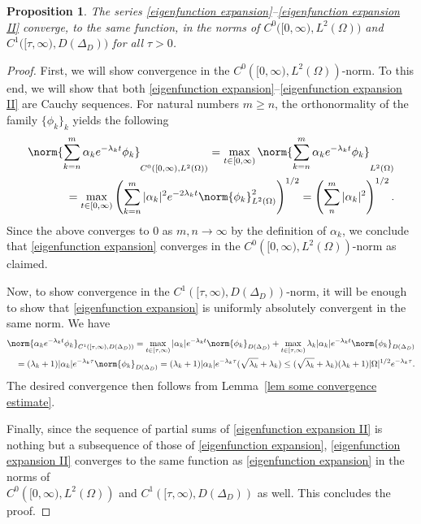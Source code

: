 \documentclass[a4paper,11pt]{article}
\newtheorem{proposition}[theorem]{Proposition}
\newcommand{\al}{\alpha}
\numberwithin{equation}{section}
\begin{document}
\begin{proposition}\label{prop convergence of series}
The series \eqref{eigenfunction expansion}--\eqref{eigenfunction expansion II}
converge, to the same function, in the norms of $C^0\big([0,\infty), L^2(\Omega)\big)$ and $C^1\big([\tau,\infty), D(\Delta_D)\big)$ for all $\tau>0$.
\end{proposition}
\begin{proof}
First, we will show convergence in the $C^0\left([0,\infty), L^2(\Omega)\right)$-norm. 
To this end, we will show that both \eqref{eigenfunction expansion}--\eqref{eigenfunction expansion II} are Cauchy sequences. For natural numbers $m\ge n$, the orthonormality of the family $\{\phi_k\}_k$ yields the following 
\begin{equation*}
\begin{aligned}
    \norm{\sum_{k=n}^m \al_k e^{-\lambda_k t }\phi_k}_{C^0\left([0,\infty),L^2(\Omega)\right)}= 
    \max_{t\in [0,\infty)}\norm{\sum_{k=n}^m \alpha_k e^{-\lambda_k t} \phi_k}_{L^2(\Omega)}\\
    =\max_{t\in [0,\infty)}\left(\sum_{k=n}^m |\alpha_k|^2 e^{-2\lambda_k t} \norm{\phi_k}^2_{L^2(\Omega)} \right)^{1/2}  = \left( \sum_{n}^m |\alpha_k|^2\right)^{1/2}.  
\end{aligned}
\end{equation*}
Since the above converges to $0$ as $m,n\to\infty$ by the definition of $\alpha_k$, we conclude that \eqref{eigenfunction expansion} converges in the $C^0\left([0,\infty),L^2(\Omega)\right)$-norm as claimed. 

Now, to show convergence in the $C^1\left([\tau,\infty),D(\Delta_D)\right)$-norm, it will be enough to show that \eqref{eigenfunction expansion} is uniformly absolutely convergent in the same norm. We have
\begin{equation*}
\begin{aligned}
    \norm{\al_k e^{-\lambda_k t} \phi_k}_{C^1\left([\tau,\infty), D(\Delta_D)\right)}= \max_{t\in [\tau,\infty)}|\alpha_k| e^{-\lambda_k t} \norm{\phi_k}_{D(\Delta_D)}+
    \max_{t\in [\tau,\infty)}\lambda_k |\alpha_k| e^{-\lambda_k t} \norm{\phi_k}_{D(\Delta_D)}\\
    = (\lambda_k+1)|\alpha_k|e^{-\lambda_k \tau} \norm{\phi_k}_{D(\Delta_D)}
    =(\lambda_k+1)|\alpha_k|e^{-\lambda_k \tau} (\sqrt{\lambda_k}+\lambda_k) \le  
    (\sqrt{\lambda_k}+\lambda_k)(\lambda_k+1)|\Omega|^{1/2}e^{-\lambda_k \tau}.
\end{aligned}
\end{equation*}
The desired convergence then follows from Lemma~\ref{lem some convergence estimate}. 

Finally, since the sequence of partial sums of \eqref{eigenfunction expansion II} is nothing but a subsequence of those of \eqref{eigenfunction expansion}, \eqref{eigenfunction expansion II} converges to the same function as \eqref{eigenfunction expansion} in the norms of\\ $C^0\left([0,\infty),L^2(\Omega)\right)$ and $C^1\left([\tau,\infty), D(\Delta_D)\right)$ as well. This concludes the proof.
\end{proof}
\end{document}

